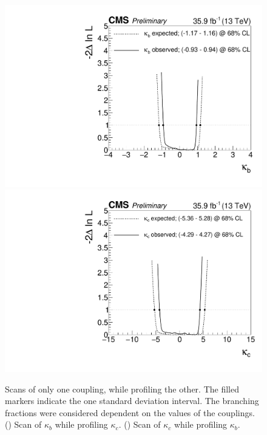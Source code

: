 \begin{figure}[Hbtp]
  \begin{center}
    \includegraphics[width=\cmsFigWidth]{img/resultsapproval/reworked/onekappascan_kbkc_couplingdependentBRs_kappab.pdf}
    \includegraphics[width=\cmsFigWidth]{img/resultsapproval/reworked/onekappascan_kbkc_couplingdependentBRs_kappac.pdf}
    \caption{
        Scans of only one coupling, while profiling the other.
        The filled markers indicate the one standard deviation interval.
        The branching fractions were considered dependent on the values of the couplings.
        (\cmsLeft)
            Scan of $\kappa_b$ while profiling $\kappa_c$.
        (\cmsRight)
            Scan of $\kappa_c$ while profiling $\kappa_b$.
        }
    \label{fig:scans_kappabkappac_oneDimScans}
  \end{center}
\end{figure}

